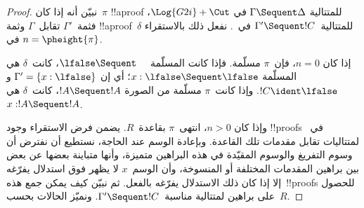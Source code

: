 \documentclass[../../../include/open-logic-section]{subfiles}
\begin{document}
\begin{proof}
  نبيّن أنه إذا كان~$\pi$ !!a{proof} للمتتالية $\Gamma \Sequent \Delta$ في
  $\Log{G2i}+\Cut$، فثمة~$\Gamma'$ تقابل~$\Gamma$ وثمة
  !!a{proof}~$\delta$ للمتتالية~$\Gamma' \Sequent !C$ في~.
  نفعل ذلك بالاستقراء في $n = \pheight{\pi}$.

  إذا كان $n = 0$، فإن~$\pi$ مسلّمة. فإذا كانت المسلّمة $\lfalse \Sequent
  \quad$، كانت~$\delta$ هي المسلّمة $x:\lfalse \Sequent \lfalse$؛ أي إن
  $\Gamma' = \{x:\lfalse\}$ و$!C \ident \lfalse$. وإذا كانت~$\pi$ مسلّمة
  من الصورة $!A \Sequent !A$، كانت~$\delta$ هي $x: !A \Sequent !A$.
  
  وإذا كان $n>0$، انتهى~$\pi$ بقاعدة~$R$. يضمن فرض الاستقراء وجود
  !!{proof}s في~ لمتتاليات تقابل مقدمات تلك القاعدة. وبإعادة
  الوسم عند الحاجة، نستطيع أن نفترض أن وسوم التفريغ والوسوم المقيّدة في هذه
  البراهين متميزة، وأنها متباينة بعضها عن بعض بين براهين المقدمات المختلفة
  أو المنسوخة، وأن الوسم~$x$ لا يظهر فوق استدلال يفرّغه إلا إذا كان ذلك
  الاستدلال يفرّغه بالفعل. ثم نبيّن كيف يمكن جمع هذه~!!{proof}s للحصول على
  براهين لمتتالية مناسبة~$\Gamma' \Sequent !C$. ونميّز الحالات بحسب~$R$.


\end{proof}
\end{document}
